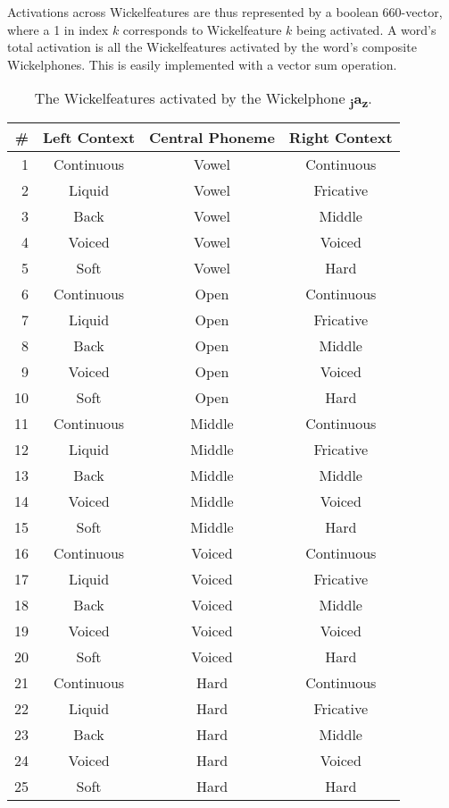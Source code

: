 \documentclass[11pt,a4paper]{article}
\begin{document}
Activations across Wickelfeatures are thus represented by a boolean 660-vector, where a 1 in index $k$ corresponds to
Wickelfeature $k$ being activated. A word's total activation is all the Wickelfeatures activated by the word's composite Wickelphones. This is easily implemented with a vector sum operation.

\begin{table}[t!]
\begin{center}
	\small
\begin{tabular}{r|c|c|c}
	\# & Left Context & Central Phoneme & Right Context \\ \hline
	1 & Continuous & Vowel & Continuous \\
	2 & Liquid & Vowel & Fricative \\
	3 & Back & Vowel & Middle \\
	4 & Voiced & Vowel & Voiced \\
	5 & Soft & Vowel & Hard \\
	6 & Continuous & Open & Continuous \\
	7 & Liquid & Open & Fricative \\
	8 & Back & Open & Middle \\
	9 & Voiced & Open & Voiced \\
	10 & Soft & Open & Hard \\
	11 & Continuous & Middle & Continuous \\
	12 & Liquid & Middle & Fricative \\
	13 & Back & Middle & Middle \\
	14 & Voiced & Middle & Voiced \\
	15 & Soft & Middle & Hard \\
	16 & Continuous & Voiced & Continuous \\
	17 & Liquid & Voiced & Fricative \\
	18 & Back & Voiced & Middle \\
	19 & Voiced & Voiced & Voiced \\
	20 & Soft & Voiced & Hard \\
	21 & Continuous & Hard & Continuous \\
	22 & Liquid & Hard & Fricative \\
	23 & Back & Hard & Middle \\
	24 & Voiced & Hard & Voiced \\
	25 & Soft & Hard & Hard \\
\end{tabular}
\end{center}
\caption{\label{features} The Wickelfeatures activated by the Wickelphone
		                  \textbf{\textsubscript{j}a\textsubscript{z}}.}
\end{table}
\end{document}
